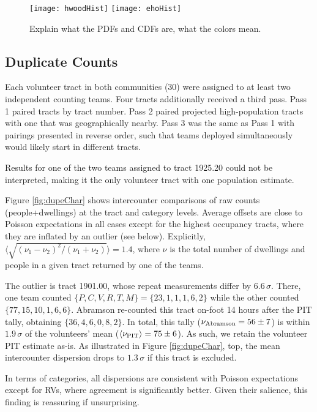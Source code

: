 \documentclass[11pt,twocolumn]{article}
\begin{document}
\begin{figure}[t]
	\centering
	\texttt{[image: hwoodHist]}
	\texttt{[image: ehoHist]}
	\caption{Explain what the PDFs and CDFs are, what the colors mean.}
	\label{fig:communityPDFs}
\end{figure}

\subsection{Duplicate Counts}
\label{sec:dupes}

Each volunteer tract in both communities (30) were assigned to at least two independent counting teams.
Four tracts additionally received a third pass. Pass 1 paired tracts by tract number. Pass 2 paired projected 
high-population tracts with one that was geographically nearby. Pass 3 was the same as Pass 1 with 
pairings presented in reverse order, such that teams deployed simultaneously would likely start in different 
tracts. 

Results for one of the two teams assigned to tract 1925.20 could not be interpreted, making it the only
volunteer tract with one population estimate.

Figure \ref{fig:dupeChar} shows intercounter comparisons of raw counts (people+dwellings)
at the tract and category levels. Average offsets are close to Poisson expectations in all cases 
except for the highest occupancy tracts, where they are inflated by an outlier (see below).
Explicitly, $\langle\sqrt{(\nu_{1}-\nu_{2})^{2}/(\nu_{1} + \nu_{2})}\rangle=1.4$, where
$\nu$ is the total number of dwellings and people in a given tract returned by one of the teams. 

The outlier is tract 1901.00, whose repeat measurements differ by $6.6\,\sigma$. There, 
one team counted $\{P,C,V,R,T,M\}=\{23,1,1,1,6,2\}$ while the other counted $\{77,15,10,1,6,6\}$. 
Abramson re-counted this tract on-foot 14 hours after the PIT tally, obtaining $\{36, 4, 6, 0, 8, 2\}$.
In total, this tally ($\nu_{\rm Abramson}=56\pm7$) is within $1.9\,\sigma$ of the volunteers' mean 
($\langle\nu_{\rm PIT}\rangle=75\pm6$). As such, we retain the volunteer PIT estimate as-is. As illustrated in 
Figure \ref{fig:dupeChar}, top, the mean intercounter dispersion drops to $1.3\,\sigma$ if this tract is 
excluded.

In terms of categories, all dispersions are consistent with Poisson expectations except for RVs, where 
agreement is significantly better. Given their salience, this finding is reassuring if unsurprising.
\end{document}
